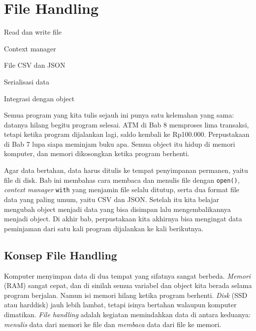 \chapter{File Handling}

\begin{dibabini}
  \item Read dan write file
  \item Context manager
  \item File CSV dan JSON
  \item Serialisasi data
  \item Integrasi dengan object
\end{dibabini}

Semua program yang kita tulis sejauh ini punya satu kelemahan yang sama: datanya hilang begitu program selesai. ATM di Bab 8 memproses lima transaksi, tetapi ketika program dijalankan lagi, saldo kembali ke Rp100.000. Perpustakaan di Bab 7 lupa siapa meminjam buku apa. Semua object itu hidup di memori komputer, dan memori dikosongkan ketika program berhenti.

Agar data bertahan, data harus ditulis ke tempat penyimpanan permanen, yaitu file di disk. Bab ini membahas cara membaca dan menulis file dengan \texttt{open()}, \emph{context manager} \texttt{with} yang menjamin file selalu ditutup, serta dua format file data yang paling umum, yaitu CSV dan JSON. Setelah itu kita belajar mengubah object menjadi data yang bisa disimpan lalu mengembalikannya menjadi object. Di akhir bab, perpustakaan kita akhirnya bisa mengingat data peminjaman dari satu kali program dijalankan ke kali berikutnya.

\section{Konsep File Handling}

Komputer menyimpan data di dua tempat yang sifatnya sangat berbeda. \emph{Memori} (RAM) sangat cepat, dan di sinilah semua variabel dan object kita berada selama program berjalan. Namun isi memori hilang ketika program berhenti. \emph{Disk} (SSD atau harddisk) jauh lebih lambat, tetapi isinya bertahan walaupun komputer dimatikan. \emph{File handling} adalah kegiatan memindahkan data di antara keduanya: \emph{menulis} data dari memori ke file dan \emph{membaca} data dari file ke memori.

